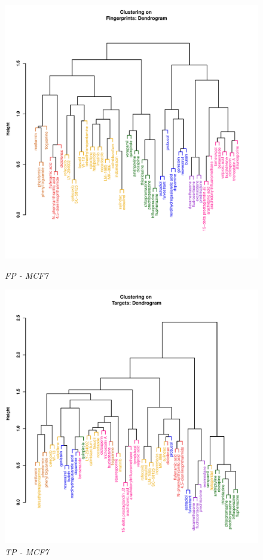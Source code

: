 \documentclass[a4paper]{article}
\begin{document}
\begin{figure}[h!]
  \begin{minipage}[b]{.5\linewidth}
     \centering
\includegraphics{IntClustVignette-ClusterPlotF}
\caption{{\it FP - MCF7}\label{MCF7_F}}
\end{minipage}%
  \begin{minipage}[b]{.5\linewidth}
     \centering
\includegraphics{IntClustVignette-ClusterPlotT}
\caption{{\it TP - MCF7}\label{MCF7_T}}
 \end{minipage}
\end{figure}
\end{document}
